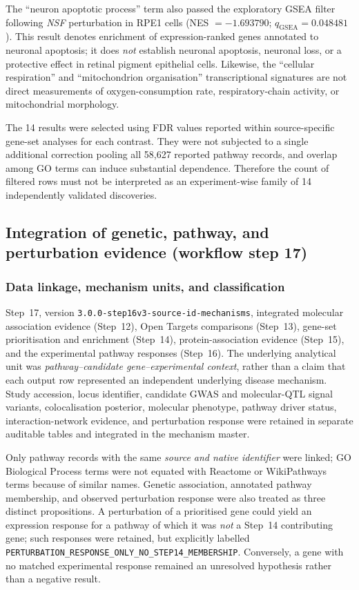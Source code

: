 \documentclass[11pt,a4paper]{article}
\begin{document}
The ``neuron apoptotic process'' term also passed the exploratory GSEA filter following \textit{NSF} perturbation in RPE1 cells (NES $=-1.693790$; $q_{\mathrm{GSEA}}=0.048481$). This result denotes enrichment of expression-ranked genes annotated to neuronal apoptosis; it does \emph{not} establish neuronal apoptosis, neuronal loss, or a protective effect in retinal pigment epithelial cells. Likewise, the ``cellular respiration'' and ``mitochondrion organisation'' transcriptional signatures are not direct measurements of oxygen-consumption rate, respiratory-chain activity, or mitochondrial morphology.

The 14 results were selected using FDR values reported within source-specific gene-set analyses for each contrast. They were not subjected to a single additional correction pooling all 58,627 reported pathway records, and overlap among GO terms can induce substantial dependence. Therefore the count of filtered rows must not be interpreted as an experiment-wise family of 14 independently validated discoveries.

\subsection{Integration of genetic, pathway, and perturbation evidence (workflow step 17)}
\label{sec:gwas2mech_step17}
\subsubsection{Data linkage, mechanism units, and classification}
\label{subsec:step17_methods}
Step~17, version \texttt{3.0.0-step16v3-source-id-mechanisms}, integrated molecular association evidence (Step~12), Open Targets comparisons (Step~13), gene-set prioritisation and enrichment (Step~14), protein-association evidence (Step~15), and the experimental pathway responses (Step~16). The underlying analytical unit was \emph{pathway--candidate gene--experimental context}, rather than a claim that each output row represented an independent underlying disease mechanism. Study accession, locus identifier, candidate GWAS and molecular-QTL signal variants, colocalisation posterior, molecular phenotype, pathway driver status, interaction-network evidence, and perturbation response were retained in separate auditable tables and integrated in the mechanism master.

Only pathway records with the same \emph{source and native identifier} were linked; GO Biological Process terms were not equated with Reactome or WikiPathways terms because of similar names. Genetic association, annotated pathway membership, and observed perturbation response were also treated as three distinct propositions. A perturbation of a prioritised gene could yield an expression response for a pathway of which it was \emph{not} a Step~14 contributing gene; such responses were retained, but explicitly labelled \texttt{PERTURBATION\_RESPONSE\_ONLY\_NO\_STEP14\_MEMBERSHIP}. Conversely, a gene with no matched experimental response remained an unresolved hypothesis rather than a negative result.
\end{document}
